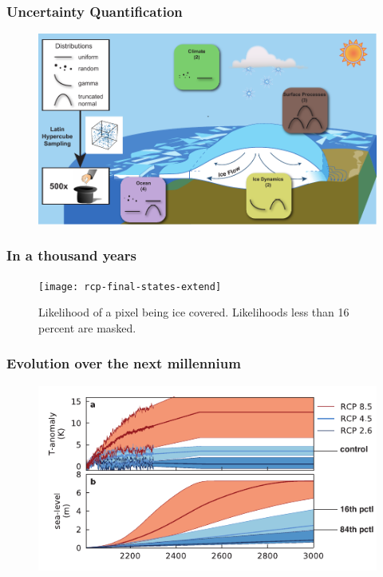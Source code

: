 \documentclass[hide notes,intlimits]{beamer}
\begin{document}
\begin{frame}
  \frametitle{Uncertainty Quantification}
    \begin{figure}
    \includegraphics[width=\textwidth]{uncertainty-quantification}
    \end{figure}
\end{frame}

\begin{frame}
  \frametitle{In a thousand years}
  \begin{figure}
    \texttt{[image: rcp-final-states-extend]}
  \caption{Likelihood of a pixel being ice covered. Likelihoods less than 16 percent are masked.}
  \end{figure}
\end{frame}

\begin{frame}
  \frametitle{Evolution over the next millennium}
  \begin{figure}
    \includegraphics[width=\textwidth]{gris-les}
  \end{figure}
\end{frame}
\end{document}
